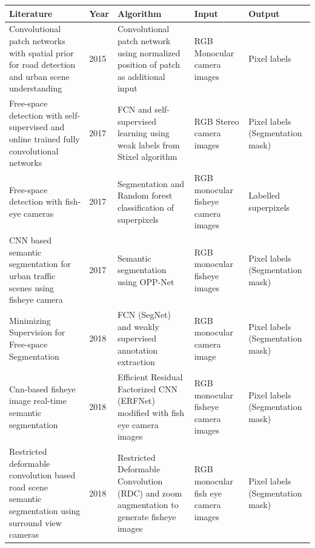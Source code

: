 \documentclass[a4paper, 12pt, oneside, BCOR1cm,toc=chapterentrywithdots]{scrbook}
\begin{document}
\begin{center}
\label{tab:table2}
\begin{tabular}{| p{5cm} | l |  p{4cm} | p{2cm} | p{2cm} |}
\hline
\textbf{Literature} & \textbf{Year} & \textbf{Algorithm} & \textbf{Input} & \textbf{Output}\\
\hline
Convolutional patch networks with spatial prior for road detection and urban scene understanding \cite{brust2015convolutional}  & 2015 & Convolutional patch network using normalized position of patch as additional input & RGB Monocular camera images & Pixel labels\\
\hline
Free-space detection with self-supervised and online trained fully convolutional networks \cite{sanberg2017free}  & 2017 & FCN and self-supervised learning using weak labels from Stixel algorithm & RGB Stereo camera images & Pixel labels (Segmentation mask)\\
\hline
Free-space detection with fish-eye cameras \cite{hanisch2017free}  & 2017 & Segmentation and Random forest classification of superpixels & RGB monocular fisheye camera images & Labelled superpixels\\
\hline
CNN based semantic segmentation for urban traffic scenes using fisheye camera \cite{deng2017cnn}  & 2017 & Semantic segmentation using OPP-Net & RGB monocular fisheye images & Pixel labels (Segmentation mask)\\
\hline
Minimizing Supervision for Free-space Segmentation \cite{tsutsui2018minimizing}  & 2018 & FCN (SegNet) and weakly supervised annotation extraction & RGB monocular camera image & Pixel labels (Segmentation mask)\\
\hline
Cnn-based fisheye image real-time semantic segmentation \cite{saez2018cnn}  & 2018 & Efficient Residual Factorized CNN (ERFNet) modified with fish eye camera images & RGB monocular fisheye camera images & Pixel labels (Segmentation mask)\\
\hline
Restricted deformable convolution based road scene semantic segmentation using surround view cameras \cite{deng2018restricted}  & 2018 & Restricted Deformable Convolution (RDC) and zoom augmentation to generate fisheye images & RGB monocular fish eye camera images & Pixel labels (Segmentation mask)\\
\hline
\end{tabular}

\end{center}
\end{document}
